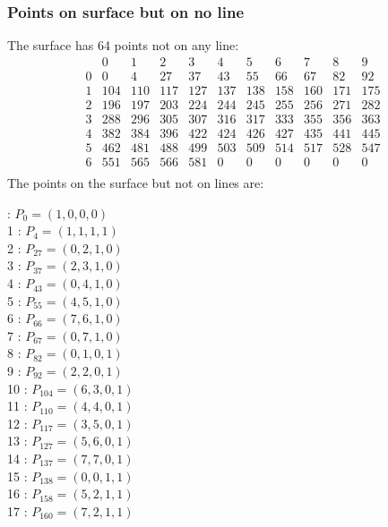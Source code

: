 \documentclass{article}
\begin{document}
{\subsubsection*{Points on surface but on no line}
The surface has 64 points not on any line:\\
$$
\begin{array}{r|*{10}{r}}
 & 0 & 1 & 2 & 3 & 4 & 5 & 6 & 7 & 8 & 9\\
\hline
0 & 0 & 4 & 27 & 37 & 43 & 55 & 66 & 67 & 82 & 92\\
1 & 104 & 110 & 117 & 127 & 137 & 138 & 158 & 160 & 171 & 175\\
2 & 196 & 197 & 203 & 224 & 244 & 245 & 255 & 256 & 271 & 282\\
3 & 288 & 296 & 305 & 307 & 316 & 317 & 333 & 355 & 356 & 363\\
4 & 382 & 384 & 396 & 422 & 424 & 426 & 427 & 435 & 441 & 445\\
5 & 462 & 481 & 488 & 499 & 503 & 509 & 514 & 517 & 528 & 547\\
6 & 551 & 565 & 566 & 581 & 0 & 0 & 0 & 0 & 0 & 0\\
\end{array}
$$
The points on the surface but not on lines are:\\
\begin{multicols}{2}
 : $P_{0}=( 1, 0, 0, 0 )$\\
1 : $P_{4}=( 1, 1, 1, 1 )$\\
2 : $P_{27}=( 0, 2, 1, 0 )$\\
3 : $P_{37}=( 2, 3, 1, 0 )$\\
4 : $P_{43}=( 0, 4, 1, 0 )$\\
5 : $P_{55}=( 4, 5, 1, 0 )$\\
6 : $P_{66}=( 7, 6, 1, 0 )$\\
7 : $P_{67}=( 0, 7, 1, 0 )$\\
8 : $P_{82}=( 0, 1, 0, 1 )$\\
9 : $P_{92}=( 2, 2, 0, 1 )$\\
10 : $P_{104}=( 6, 3, 0, 1 )$\\
11 : $P_{110}=( 4, 4, 0, 1 )$\\
12 : $P_{117}=( 3, 5, 0, 1 )$\\
13 : $P_{127}=( 5, 6, 0, 1 )$\\
14 : $P_{137}=( 7, 7, 0, 1 )$\\
15 : $P_{138}=( 0, 0, 1, 1 )$\\
16 : $P_{158}=( 5, 2, 1, 1 )$\\
17 : $P_{160}=( 7, 2, 1, 1 )$\\

\end{multicols}}
\end{document}
